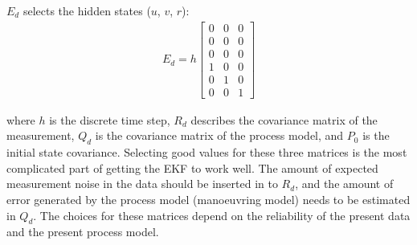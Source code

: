 \(E_d\) selects the hidden states (\(u\), \(v\), \(r\)):
\begin{equation}\label{equation:04.01_EK:eqed}
\begin{split}\displaystyle E_{d} = h \left[\begin{matrix}0 & 0 & 0\\0 & 0 & 0\\0 & 0 & 0\\1 & 0 & 0\\0 & 1 & 0\\0 & 0 & 1\end{matrix}\right]\end{split}
\end{equation}

where \(h\) is the discrete time step, \(R_d\) describes the covariance matrix of the measurement, \(Q_d\) is the covariance matrix of the process model, and \(P_0\) is the initial state covariance.
Selecting good values for these three matrices is the most complicated part of getting the EKF to work well. The amount of expected measurement noise in the data should be inserted in to \(R_d\), and the amount of error generated by the process model (manoeuvring model) needs to be estimated in \(Q_d\). The choices for these matrices depend on the reliability of the present data and the present process model.